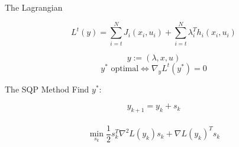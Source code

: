 \begin{frame}{The Lagrangian}
\begin{block}{ }
\[  L^{t}(y) =   \sum\limits_{i=t}^{N} J_{i}(x_{i},u_{i})
  + \sum\limits_{i=t}^{N} \lambda_{i}^{T} h_i (x_i ,u_i ) \]
\end{block}
$$ y := (\lambda,x,u) $$
\vspace{1em}
\[ y^* \text{ optimal} \Leftrightarrow \nabla_{y} L^{t}(y^*)  = 0 \]

\end{frame}

%	
%	
%		
%		
%	

\begin{frame}{The SQP Method}
Find $y^*$:
\begin{block}{ }
\[ y_{k+1} = y_{k} + s_{k} \] \\ 
\[\min_{s_k}  \frac{1}{2} s_k^T \nabla^2 L(y_k) s_k + \nabla L(y_k)^T s_k \]
\end{block}
\end{frame}

